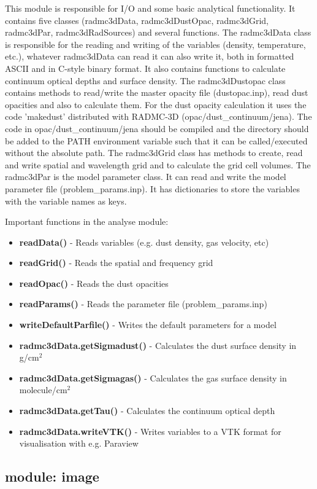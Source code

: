 \documentclass[12pt]{article}
\begin{document}
This module is responsible for I/O and some basic analytical functionality. It contains five classes 
(radmc3dData, radmc3dDustOpac, radmc3dGrid, radmc3dPar, radmc3dRadSources) and several functions. 
The radmc3dData class is responsible for the reading and writing of the variables (density, temperature, 
etc.), whatever radmc3dData can read it can also write it, both in formatted ASCII and in C-style binary format. 
It also contains functions to calculate continuum optical depths and surface density. The radmc3dDustopac class
contains methods to  read/write the master opacity file (dustopac.inp), read dust opacities and also to calculate
them. For the dust opacity calculation it uses the code 'makedust' distributed with RADMC-3D (opac/dust\_continuum/jena). 
The code in opac/dust\_continuum/jena should be compiled and the directory should be added to the PATH environment
variable such that it can be called/executed without the absolute path. The radmc3dGrid class has methods to create, read and 
write spatial and wavelength grid and to calculate the grid cell volumes. The radmc3dPar is the model parameter class. 
It can read and write the  model parameter file (problem\_params.inp). It has dictionaries to store the variables with the
variable names as keys. 

Important functions in the analyse module:
\begin{itemize}
\item[]{\bf readData()} - Reads variables (e.g. dust density, gas velocity, etc)
\item[]{\bf readGrid()} - Reads the spatial and frequency grid
\item[]{\bf readOpac()} - Reads the dust opacities
\item[]{\bf readParams()} - Reads the parameter file (problem\_params.inp)
\item[]{\bf writeDefaultParfile()} - Writes the default parameters for a model
\item[]{\bf radmc3dData.getSigmadust()} - Calculates the dust surface density in g/cm$^2$
\item[]{\bf radmc3dData.getSigmagas()} - Calculates the gas surface density in molecule/cm$^2$
\item[]{\bf radmc3dData.getTau()} - Calculates the continuum optical depth 
\item[]{\bf radmc3dData.writeVTK()} - Writes variables to a VTK format for visualisation with e.g. Paraview 
\end{itemize}

\subsection{module: image}
\label{subsec:image}
\end{document}
